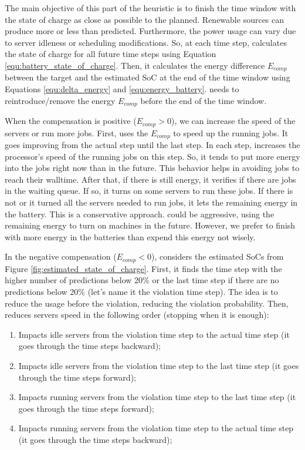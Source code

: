 The main objective of this part of the heuristic is to finish the time window with the state of charge as close as possible to the planned. Renewable sources can produce more or less than predicted. Furthermore, the power usage can vary due to server idleness or scheduling modifications. So, at each time step, \emph{\systemName} calculates the state of charge for all future time steps using Equation \ref{equ:battery_state_of_charge}. Then, it calculates the energy difference $E_{comp}$ between the target and the estimated SoC at the end of the time window using Equations \ref{equ:delta_energy} and \ref{equ:energy_battery}. \emph{\systemName} needs to reintroduce/remove the energy $E_{comp}$ before the end of the time window.

When the compensation is positive ($E_{comp}>0$), we can increase the speed of the servers or run more jobs. First, \emph{\systemName} uses the $E_{comp}$ to speed up the running jobs. It goes improving from the actual step until the last step. In each step, \emph{\systemName} increases the processor's speed of the running jobs on this step. So, it tends to put more energy into the jobs right now than in the future. This behavior helps in avoiding jobs to reach their walltime. After that, if there is still energy, it verifies if there are jobs in the waiting queue. If so, it turns on some servers to run these jobs. If there is not or it turned all the servers needed to run jobs, it lets the remaining energy in the battery. This is a conservative approach. \emph{\systemName} could be aggressive, using the remaining energy to turn on machines in the future. However, we prefer to finish with more energy in the batteries than expend this energy not wisely.

In the negative compensation ($E_{comp}<0$), \emph{\systemName} considers the estimated SoCs from Figure \ref{fig:estimated_state_of_charge}. First, it finds the time step with the higher number of predictions below 20\% or the last time step if there are no predictions below 20\% (let's name it the violation time step). The idea is to reduce the usage before the violation, reducing the violation probability. Then, \emph{\systemName} reduces servers speed in the following order (stopping when it is enough):
\begin{enumerate}
    \item Impacts idle servers from the violation time step to the actual time step (it goes through the time steps backward);
    \item Impacts idle servers from the violation time step to the last time step (it goes through the time steps forward);
    \item Impacts running servers from the violation time step to the last time step (it goes through the time steps forward);
    \item Impacts running servers from the violation time step to the actual time step (it goes through the time steps backward);
\end{enumerate}

